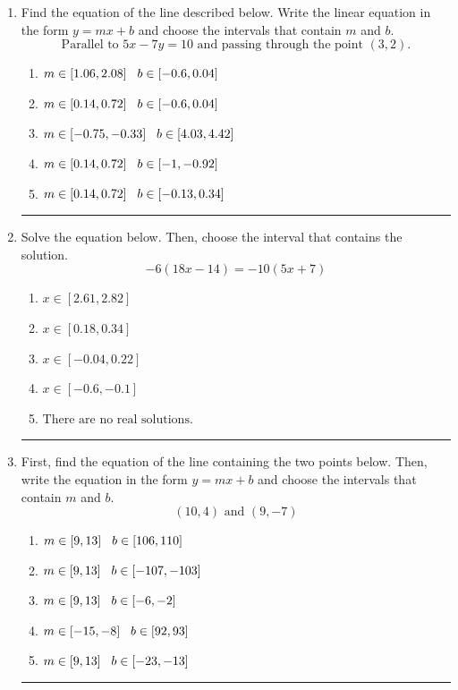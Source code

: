\documentclass[14pt]{extbook}
\newcommand{\litem}[1]{\item#1\hspace*{-1cm}\rule{\textwidth}{0.4pt}}
\begin{document}
\begin{enumerate}
{\begin{enumerate}[label=\Alph*.]
\end{enumerate} }
\litem{
Find the equation of the line described below. Write the linear equation in the form $ y=mx+b $ and choose the intervals that contain $m$ and $b$.\[ \text{Parallel to } 5 x - 7 y = 10 \text{ and passing through the point } (3, 2). \]\begin{enumerate}[label=\Alph*.]
\item \( m \in [1.06, 2.08] \hspace*{3mm} b \in [-0.6, 0.04] \)
\item \( m \in [0.14, 0.72] \hspace*{3mm} b \in [-0.6, 0.04] \)
\item \( m \in [-0.75, -0.33] \hspace*{3mm} b \in [4.03, 4.42] \)
\item \( m \in [0.14, 0.72] \hspace*{3mm} b \in [-1, -0.92] \)
\item \( m \in [0.14, 0.72] \hspace*{3mm} b \in [-0.13, 0.34] \)

\end{enumerate} }
\litem{
Solve the equation below. Then, choose the interval that contains the solution.\[ -6(18x -14) = -10(5x + 7) \]\begin{enumerate}[label=\Alph*.]
\item \( x \in [2.61, 2.82] \)
\item \( x \in [0.18, 0.34] \)
\item \( x \in [-0.04, 0.22] \)
\item \( x \in [-0.6, -0.1] \)
\item \( \text{There are no real solutions.} \)

\end{enumerate} }
\litem{
First, find the equation of the line containing the two points below. Then, write the equation in the form $ y=mx+b $ and choose the intervals that contain $m$ and $b$.\[ (10, 4) \text{ and } (9, -7) \]\begin{enumerate}[label=\Alph*.]
\item \( m \in [9, 13] \hspace*{3mm} b \in [106, 110] \)
\item \( m \in [9, 13] \hspace*{3mm} b \in [-107, -103] \)
\item \( m \in [9, 13] \hspace*{3mm} b \in [-6, -2] \)
\item \( m \in [-15, -8] \hspace*{3mm} b \in [92, 93] \)
\item \( m \in [9, 13] \hspace*{3mm} b \in [-23, -13] \)


\end{enumerate}}
\end{enumerate}
\end{document}
